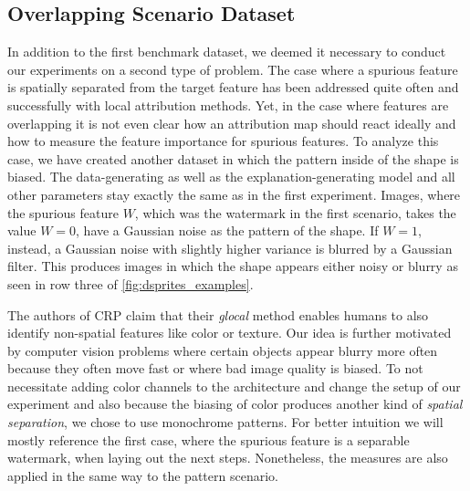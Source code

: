 \subsection{Overlapping Scenario Dataset}\label{section:dataset_overlap}
In addition to the first benchmark dataset, we deemed it necessary to conduct our experiments on a second type of problem.
The case where a spurious feature is spatially separated from the target feature has been addressed quite often and successfully with local attribution methods. Yet, in the case where features are overlapping it is not even clear how an attribution map should react ideally and how to measure the feature importance for spurious features. To analyze this case, we have created another dataset in which the pattern inside of the shape is biased. The data-generating as well as the explanation-generating model and all other parameters stay exactly the same as in the first experiment.
Images, where the spurious feature $W$, which was the watermark in the first scenario, takes the value $W=0$, have a Gaussian noise as the pattern of the shape. If $W= 1$, instead, a Gaussian noise with slightly higher variance is blurred by a Gaussian filter. This produces images in which the shape appears either noisy or blurry as seen in row three of \cref{fig:dsprites_examples}. 

The authors of CRP claim that their \textit{glocal} method enables humans to also identify non-spatial features like color or texture. Our idea is further motivated by computer vision problems where certain objects appear blurry more often because they often move fast or where bad image quality is biased.
To not necessitate adding color channels to the architecture and change the setup of our experiment and also because the biasing of color produces another kind of \textit{spatial separation}, we chose to use monochrome patterns.
For better intuition we will mostly reference the first case, where the spurious feature is a separable watermark, when laying out the next steps. Nonetheless, the measures are also applied in the same way to the pattern scenario. 
